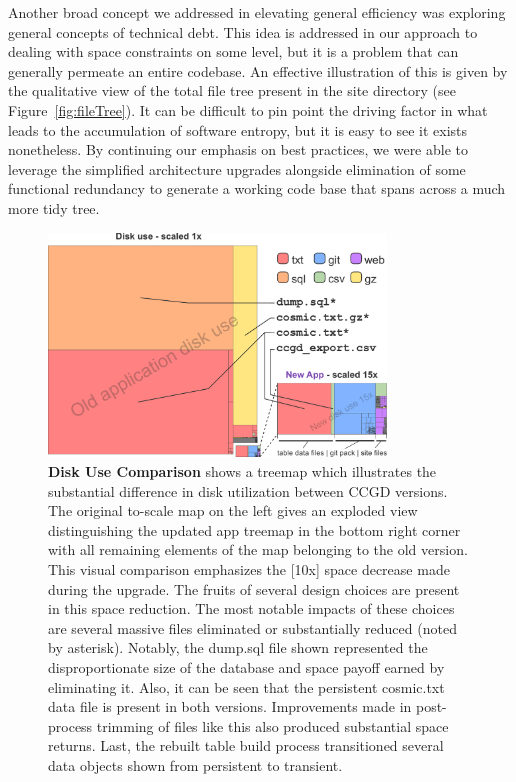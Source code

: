 \documentclass[10pt]{report}
\begin{document}
Another broad concept we addressed in elevating general efficiency was exploring general concepts of technical debt. This idea is addressed in our approach to dealing with space constraints on some level, but it is a problem that can generally permeate an entire codebase. An effective illustration of this is given by the qualitative view of the total file tree present in the site directory (see Figure~\ref{fig:fileTree}). It can be difficult to pin point the driving factor in what leads to the accumulation of software entropy, but it is easy to see it exists nonetheless. By continuing our emphasis on best practices, we were able to leverage the simplified architecture upgrades alongside elimination of some functional redundancy to generate a working code base that spans across a much more tidy tree.

\begin{figure}[H]
    \center{}
    \includegraphics[width=0.8\textwidth]{fig/space_tree.pdf}
    \caption[Disk Use Comparison]{\textbf{Disk Use Comparison} shows a treemap which illustrates the substantial difference in disk utilization between CCGD versions. The original to-scale map on the left gives an exploded view distinguishing the updated app treemap in the bottom right corner with all remaining elements of the map belonging to the old version. This visual comparison emphasizes the [10x] space decrease made during the upgrade. The fruits of several design choices are present in this space reduction. The most notable impacts of these choices are several massive files eliminated or substantially reduced (noted by asterisk). Notably, the dump.sql file shown represented the disproportionate size of the database and space payoff earned by eliminating it. Also, it can be seen that the persistent cosmic.txt data file is present in both versions. Improvements made in post-process trimming of files like this also produced substantial space returns. Last, the rebuilt table build process transitioned several data objects shown from persistent to transient.}\label{fig:spaceTree}
\end{figure}
\end{document}
